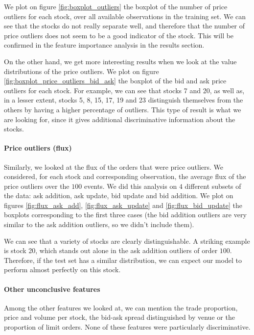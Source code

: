 \documentclass[switch, 11pt]{article}
\begin{document}
\begin{multicols}{2}
    We plot on figure \ref{fig:boxplot_outliers} the boxplot of the number of price outliers for each stock, over all available observations in the training set. We can see that the stocks do not really separate well, and therefore that the number of price outliers does not seem to be a good indicator of the stock. This will be confirmed in the feature importance analysis in the results section.

    On the other hand, we get more interesting results when we look at the value distributions of the price outliers. We plot on figure \ref{fig:boxplot_price_outliers_bid_ask} the boxplot of the bid and ask price outliers for each stock. For example, we can see that stocks 7 and 20, as well as, in a lesser extent, stocks 5, 8, 15, 17, 19 and 23 distinguish themselves from the others by having a higher percentage of outliers. This type of result is what we are looking for, since it gives additional discriminative information about the stocks.

    \paragraph{Price outliers (flux)}
    Similarly, we looked at the flux of the orders that were price outliers. We considered, for each stock and corresponding observation, the average flux of the price outliers over the $100$ events. We did this analysis on $4$ different subsets of the data: ask addition, ask update, bid update and bid addition.
    We plot on figures \ref{fig:flux_ask_add}, \ref{fig:flux_ask_update} and \ref{fig:flux_bid_update} the boxplots corresponding to the first three cases (the bid addition outliers are very similar to the ask addition outliers, so we didn't include them).

    We can see that a variety of stocks are clearly distinguishable. A striking example is stock 20, which stands out alone in the ask addition outliers of order $100$. Therefore, if the test set has a similar distribution, we can expect our model to perform almost perfectly on this stock.

    \paragraph{Other unconclusive features} Among the other features we looked at, we can mention the trade proportion, price and volume per stock, the bid-ask spread distinguished by venue or the proportion of limit orders. None of these features were particularly discriminative.


\end{multicols}
\end{document}
